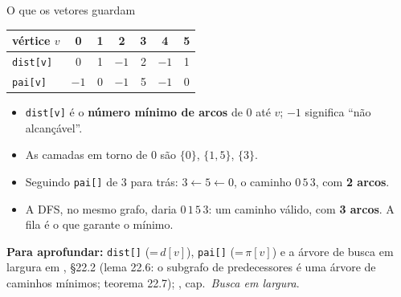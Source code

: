 \documentclass[aspectratio=169]{beamer}
\newcommand{\fonte}[1]{%
  \vfill
  {\tiny\color{gray!55!black}\textbf{Para aprofundar:} #1\par}%
}
\begin{document}
\begin{frame}{O que os vetores guardam}
  \begin{center}
  {\small
  \begin{tabular}{lcccccc}
    \toprule
    vértice $v$      & 0 & 1 & 2 & 3 & 4 & 5 \\
    \midrule
    \texttt{dist[v]} & 0 & 1 & $-1$ & 2 & $-1$ & 1 \\
    \texttt{pai[v]}  & $-1$ & 0 & $-1$ & 5 & $-1$ & 0 \\
    \bottomrule
  \end{tabular}}
  \end{center}
  \medskip
  {\small
  \begin{itemize}\small
    \item \texttt{dist[v]} é o \textbf{número mínimo de arcos} de 0 até $v$;
          $-1$ significa ``não alcançável''.
    \item As camadas em torno de 0 são $\{0\}$, $\{1,5\}$, $\{3\}$.
    \item Seguindo \texttt{pai[]} de 3 para trás: $3 \leftarrow 5 \leftarrow 0$,
          o caminho $0\,5\,3$, com \textbf{2 arcos}.
    \item A DFS, no mesmo grafo, daria $0\,1\,5\,3$: um caminho válido, com
          \textbf{3 arcos}. A fila é o que garante o mínimo.
  \end{itemize}}
  \fonte{\texttt{dist[]} (=\,$d[v]$), \texttt{pai[]} (=\,$\pi[v]$) e a árvore de
  busca em largura em \cite{cormen2009introduction}, §22.2 (lema 22.6: o subgrafo de
  predecessores é uma árvore de caminhos mínimos; teorema 22.7); \cite{feofiloff2020algoritmos}, cap.\ \emph{Busca em largura}.}
\end{frame}
\end{document}

